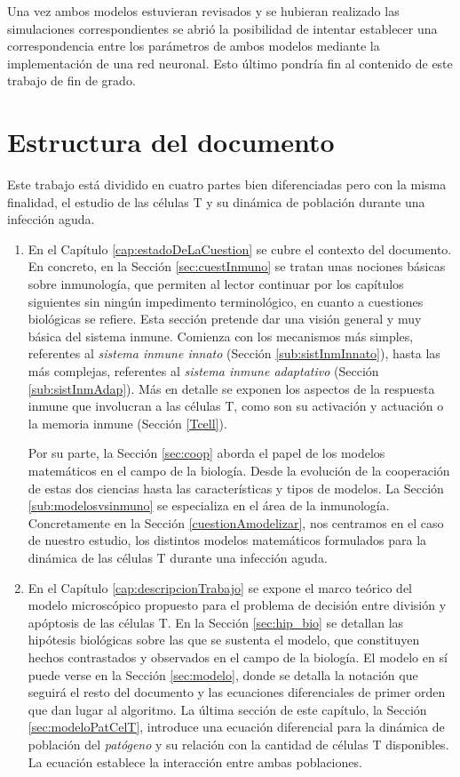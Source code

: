 Una vez ambos modelos estuvieran revisados y se hubieran realizado las simulaciones correspondientes se abrió la posibilidad de intentar establecer una correspondencia entre los parámetros de ambos modelos mediante la implementación de una red neuronal. Esto último pondría fin al contenido de este trabajo de fin de grado.


\section{Estructura del documento}

Este trabajo está dividido en cuatro partes bien diferenciadas pero con la misma finalidad, el estudio de las células T y su dinámica de población durante una infección aguda. 

\begin{enumerate}
	\item En el Capítulo \ref{cap:estadoDeLaCuestion} se cubre el contexto del documento. En concreto, en la Sección \ref{sec:cuestInmuno} se tratan unas nociones básicas sobre inmunología, que permiten al lector continuar por los capítulos siguientes sin ningún impedimento terminológico, en cuanto a cuestiones biológicas se refiere. Esta sección pretende dar una visión general y muy básica del sistema inmune. Comienza con los mecanismos más simples, referentes al \textit{sistema inmune innato} (Sección \ref{sub:sistInmInnato}), hasta las más complejas, referentes al \textit{sistema inmune adaptativo} (Sección \ref{sub:sistInmAdap}). Más en detalle se exponen los aspectos de la respuesta inmune que involucran a las células T, como son su activación y actuación o la memoria inmune (Sección \ref{Tcell}). 
	
	Por su parte, la Sección \ref{sec:coop} aborda el papel de los modelos matemáticos en el campo de la biología. Desde la evolución de la cooperación de estas dos ciencias hasta las características y tipos de modelos. La Sección \ref{sub:modelosvsinmuno} se especializa en el área de la inmunología. Concretamente en la Sección \ref{cuestionAmodelizar}, nos centramos en el caso de nuestro estudio, los distintos modelos matemáticos formulados para la dinámica de las células T durante una infección aguda.
	 
	
	\item En el Capítulo \ref{cap:descripcionTrabajo} se expone el marco teórico del modelo microscópico propuesto para el problema de decisión entre división y apóptosis de las células T. En la Sección \ref{sec:hip_bio} se detallan las hipótesis biológicas sobre las que se sustenta el modelo, que constituyen hechos contrastados y observados en el campo de la biología. El modelo en sí puede verse en la Sección \ref{sec:modelo}, donde se detalla la notación que seguirá el resto del documento y las ecuaciones diferenciales de primer orden que dan lugar al algoritmo. La última sección de este capítulo, la Sección \ref{sec:modeloPatCelT}, introduce una ecuación diferencial para la dinámica de población del \textit{patógeno} y su relación con la cantidad de células T disponibles. La ecuación establece la interacción entre ambas poblaciones.
	

\end{enumerate}
